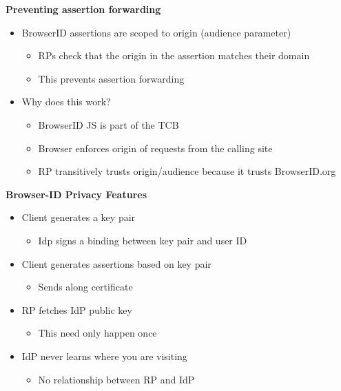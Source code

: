 \documentclass[helvetica]{seminar}
\newcommand{\heading}[1]{%
  \begin{center} 
    \large\bf 
    #1 
  \end{center} 
  \vspace{.4 in}}
\begin{document}
\begin{slide}
\heading{Preventing assertion forwarding}

\begin{itemize}
\item BrowserID assertions are scoped to origin (audience parameter)
  \begin{itemize}
  \item RPs check that the origin in the assertion matches their domain
  \item This prevents assertion forwarding
  \end{itemize}

\item Why does this work?
  \begin{itemize}
  \item BrowserID JS is part of the TCB
  \item Browser enforces origin of requests from the calling site
  \item RP transitively trusts origin/audience because it trusts BrowserID.org
  \end{itemize}
\end{itemize}

\end{slide}
        



\begin{slide}
\heading{Browser-ID Privacy Features}

\begin{itemize}
\item Client generates a key pair
  \begin{itemize}
  \item Idp signs a binding between key pair and user ID
  \end{itemize}

\item Client generates assertions based on key pair
  \begin{itemize}
  \item Sends along certificate
  \end{itemize}

\item RP fetches IdP public key
  \begin{itemize}
  \item This need only happen once
  \end{itemize}

\item IdP never learns where you are visiting
  \begin{itemize}
  \item No relationship between RP and IdP
  \end{itemize}


\end{itemize}

\end{slide}
\end{document}
